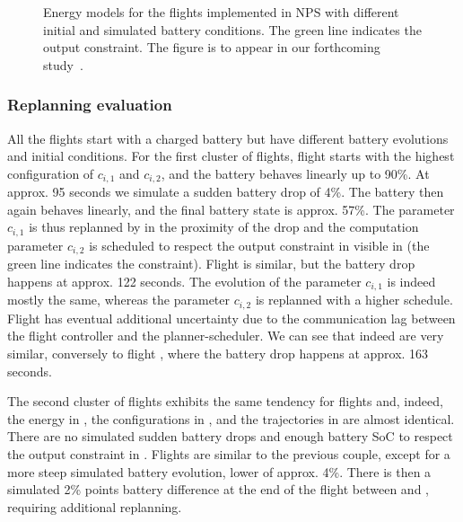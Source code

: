 \begin{figure}[p!]
  \centering
  \selectfont
  \footnotesize    
  
  \caption[Energy models for the flights implemented in NPS]{Energy models for the flights implemented in NPS with different initial and simulated battery conditions. The green line indicates the output constraint. The figure is to appear in our forthcoming study~\citep{seewald202Xenergy}.}
  \label{fig:ener-pprz}
\end{figure}

\subsubsection*{Replanning evaluation}

All the flights start with a charged battery but have different battery evolutions and initial conditions. For the first cluster of flights, flight  starts with the highest configuration of $c_{i,1}$ and $c_{i,2}$, and the battery behaves linearly up to 90\%. At approx. 95 seconds we simulate a sudden battery drop of 4\%. The battery then again behaves linearly, and the final battery state is approx. 57\%. The parameter $c_{i,1}$ is thus replanned by  in the proximity of the drop and the computation parameter $c_{i,2}$ is scheduled to respect the output constraint in  visible in  (the green line indicates the constraint). Flight  is similar, but the battery drop happens at approx. 122 seconds. The evolution of the parameter $c_{i,1}$ is indeed mostly the same, whereas the parameter $c_{i,2}$ is replanned with a higher schedule. Flight  has eventual additional uncertainty due to the communication lag between the flight controller and the planner-scheduler. We can see that indeed  are very similar, conversely to flight , where the battery drop happens at approx. 163 seconds.

The second cluster of flights exhibits the same tendency for flights  and, indeed, the energy in , the configurations in , and the trajectories in  are almost identical. There are no simulated sudden battery drops and enough battery SoC to respect the output constraint in . Flights  are similar to the previous couple, except for a more steep simulated battery evolution, lower of approx. 4\%. There is then a simulated 2\% points battery difference at the end of the flight between  and , requiring additional replanning.

